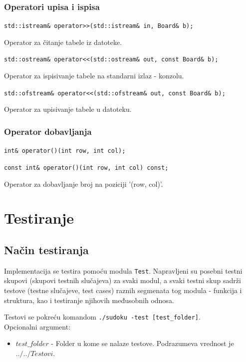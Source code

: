 \documentclass[a4paper]{article}
\begin{document}
    \subsubsection{Operatori upisa i ispisa}
    \par\texttt{std::istream\& operator>>(std::istream\& in, Board\& b);}
    \par Operator za čitanje tabele iz datoteke.
    \par\texttt{std::ostream\& operator<<(std::ostream\& out, const Board\& b);}
    \par Operator za ispisivanje tabele na standarni izlaz - konzolu.
    \par\texttt{std::ofstream\& operator<<(std::ofstream\& out, const Board\& b);}
    \par Operator za upisivanje tabele u datoteku. 

    \subsubsection{Operator dobavljanja}
    \par\texttt{int\& operator()(int row, int col);}
    \par\texttt{const int\& operator()(int row, int col) const;}
    \par Operator za dobavljanje broj na poziciji '(row, col)'.
    
    \newpage
    \section{Testiranje}
    \subsection{Način testiranja}
    Implementacija se testira pomoću modula \texttt{Test}. Napravljeni su posebni testni skupovi (skupovi testnih slučajeva) za svaki modul, 
    a svaki testni skup sadrži testove (testne slučajeve, test cases) raznih segmenata tog modula - funkcija i struktura, kao i testiranje njihovih međusobnih odnosa.
    \par Testovi se pokreću komandom \texttt{./sudoku -test [test\_folder]}.\\
    Opcionalni argument:
    \begin{itemize}
        \item $test\_folder$ - Folder u kome se nalaze testove. Podrazumeva vrednost je $../../Testovi$.
    \end{itemize}
\end{document}

